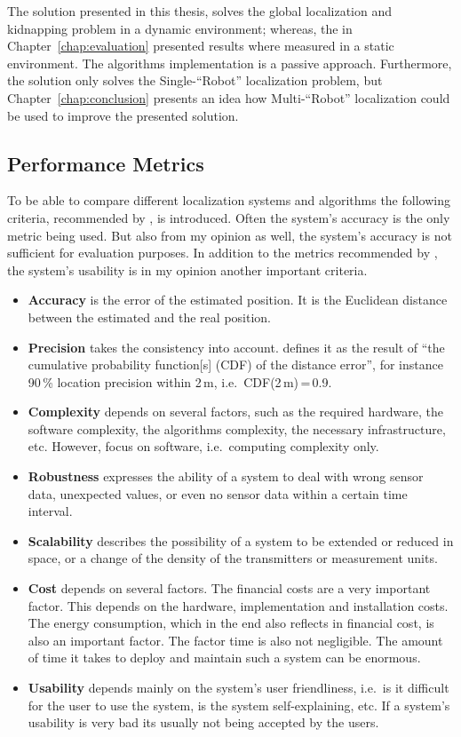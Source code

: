 \noindent The solution presented in this thesis, solves the global localization and kidnapping problem in a dynamic environment; whereas, the in Chapter~\ref{chap:evaluation} presented results where measured in a static environment. The algorithms implementation is a passive approach. Furthermore, the solution only solves the Single-``Robot'' localization problem, but Chapter~\ref{chap:conclusion} presents an idea how Multi-``Robot'' localization could be used to improve the presented solution.

\subsection{Performance Metrics}
To be able to compare different localization systems and algorithms the following criteria, recommended by \citet{IEEE:survey_wireless_indoor_pos}, is introduced. Often the system's accuracy is the only metric being used. But also from my opinion as well, the system's accuracy is not sufficient for evaluation purposes. In addition to the metrics recommended by \citet{IEEE:survey_wireless_indoor_pos}, the system's usability is in my opinion another important criteria.
\begin{itemize}
	\item \textbf{Accuracy} is the error of the estimated position. It is the Euclidean distance between the estimated and the real position.
	\item \textbf{Precision} takes the consistency into account. \citet{IEEE:survey_wireless_indoor_pos} defines it as the result of ``the cumulative probability function[s] (\acs{CDF}) of the distance error'', for instance 90\,\% location precision within 2\,m, i.e.\ \acs{CDF}(2\,m)\,=\,0.9.
	\item \textbf{Complexity} depends on several factors, such as the required hardware, the software complexity, the algorithms complexity, the necessary infrastructure, etc. However, \citet{IEEE:survey_wireless_indoor_pos} focus on software, i.e.\ computing complexity only.
	\item \textbf{Robustness} expresses the ability of a system to deal with wrong sensor data, unexpected values, or even no sensor data within a certain time interval.
	\item \textbf{Scalability} describes the possibility of a system to be extended or reduced in space, or a change of the density of the transmitters or measurement units.
	\item \textbf{Cost} depends on several factors. The financial costs are a very important factor. This depends on the hardware, implementation and installation costs. The energy consumption, which in the end also reflects in financial cost, is also an important factor. The factor time is also not negligible. The amount of time it takes to deploy and maintain such a system can be enormous.
	\item \textbf{Usability} depends mainly on the system's user friendliness, i.e.\ is it difficult for the user to use the system, is the system self-explaining, etc. If a system's usability is very bad its usually not being accepted by the users.
\end{itemize}

